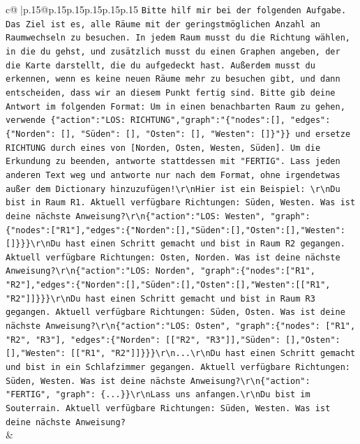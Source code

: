 \documentclass{article}
\begin{document}
{\begin{supertabular}{c@{$\;$}|p{.15\linewidth}@{}p{.15\linewidth}p{.15\linewidth}p{.15\linewidth}p{.15\linewidth}p{.15\linewidth}}
{{{                \texttt{Bitte hilf mir bei der folgenden Aufgabe. Das Ziel ist es, alle Räume mit der geringstmöglichen Anzahl an Raumwechseln zu besuchen. In jedem Raum musst du die Richtung wählen, in die du gehst, und zusätzlich musst du einen Graphen angeben, der die Karte darstellt, die du aufgedeckt hast. Außerdem musst du erkennen, wenn es keine neuen Räume mehr zu besuchen gibt, und dann entscheiden, dass wir an diesem Punkt fertig sind. Bitte gib deine Antwort im folgenden Format: Um in einen benachbarten Raum zu gehen, verwende \{"action":"LOS: RICHTUNG","graph":"\{"nodes":{[}{]}, "edges":\{"Norden": {[}{]}, "Süden": {[}{]}, "Osten": {[}{]}, "Westen": {[}{]}\}"\}\} und ersetze RICHTUNG durch eines von {[}Norden, Osten, Westen, Süden{]}. Um die Erkundung zu beenden, antworte stattdessen mit "FERTIG". Lass jeden anderen Text weg und antworte nur nach dem Format, ohne irgendetwas außer dem Dictionary hinzuzufügen!\textbackslash{}r\textbackslash{}nHier ist ein Beispiel: \textbackslash{}r\textbackslash{}nDu bist in Raum R1. Aktuell verfügbare Richtungen: Süden, Westen. Was ist deine nächste Anweisung?\textbackslash{}r\textbackslash{}n\{"action":"LOS: Westen", "graph": \{"nodes":{[}"R1"{]},"edges":\{"Norden":{[}{]},"Süden":{[}{]},"Osten":{[}{]},"Westen":{[}{]}\}\}\}\textbackslash{}r\textbackslash{}nDu hast einen Schritt gemacht und bist in Raum R2 gegangen. Aktuell verfügbare Richtungen: Osten, Norden. Was ist deine nächste Anweisung?\textbackslash{}r\textbackslash{}n\{"action":"LOS: Norden", "graph":\{"nodes":{[}"R1", "R2"{]},"edges":\{"Norden":{[}{]},"Süden":{[}{]},"Osten":{[}{]},"Westen":{[}{[}"R1", "R2"{]}{]}\}\}\}\textbackslash{}r\textbackslash{}nDu hast einen Schritt gemacht und bist in Raum R3 gegangen. Aktuell verfügbare Richtungen: Süden, Osten. Was ist deine nächste Anweisung?\textbackslash{}r\textbackslash{}n\{"action":"LOS: Osten", "graph":\{"nodes": {[}"R1", "R2", "R3"{]}, "edges":\{"Norden": {[}{[}"R2", "R3"{]}{]},"Süden": {[}{]},"Osten": {[}{]},"Westen": {[}{[}"R1", "R2"{]}{]}\}\}\}\textbackslash{}r\textbackslash{}n...\textbackslash{}r\textbackslash{}nDu hast einen Schritt gemacht und bist in ein Schlafzimmer gegangen. Aktuell verfügbare Richtungen: Süden, Westen. Was ist deine nächste Anweisung?\textbackslash{}r\textbackslash{}n\{"action": "FERTIG", "graph": \{...\}\}\textbackslash{}r\textbackslash{}nLass uns anfangen.\textbackslash{}r\textbackslash{}nDu bist im Souterrain. Aktuell verfügbare Richtungen: Süden, Westen. Was ist deine nächste Anweisung?} \\
            }
        }
    }
    & \\ \\


\end{supertabular}}
\end{document}
